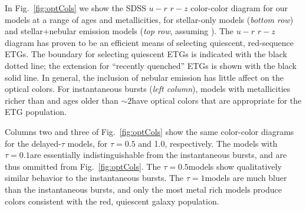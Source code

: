 In Fig.~\ref{fig:optCols} we show the SDSS $u-r$ \vs $r-z$ color-color diagram for our models at a range of ages and metallicities, for stellar-only models (\emph{bottom row}) and stellar+nebular emission models (\emph{top row}, assuming ). The $u-r$ \vs $r-z$ diagram has proven to be an efficient means of selecting quiescent, red-sequence ETGs. The \citet{Holden+2012} boundary for selecting quiescent ETGs is indicated with the black dotted line; the \citet{McIntosh+2014} extension for ``recently quenched'' ETGs is shown with the black solid line. In general, the inclusion of nebular emission has little affect on the optical colors. For instantaneous bursts (\emph{left column}), models with metallicities richer than  and ages older than $\sim2$\Gyr have optical colors that are appropriate for the ETG population.

Columns two and three of Fig.~\ref{fig:optCols} show the same color-color diagrams for the delayed-$\tau$ models, for $\tau = 0.5$ and 1.0\Gyr, respectively. The models with $\tau=0.1$\Gyr are essentially indistinguishable from the instantaneous bursts, and are thus ommitted from Fig.~\ref{fig:optCols}. The $\tau=0.5$\Gyr models show qualitatively similar behavior to the instantaneous bursts. The $\tau=1$\Gyr models are much bluer than the instantaneous bursts, and only the most metal rich models produce colors consistent with the red, quiescent galaxy population.


